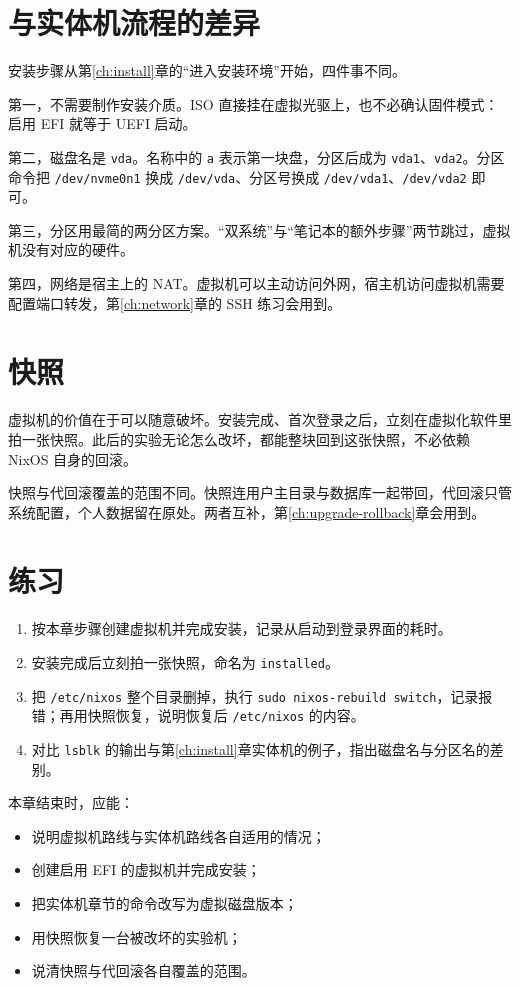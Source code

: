\section{与实体机流程的差异}

安装步骤从第\ref{ch:install}章的“进入安装环境”开始，四件事不同。

第一，不需要制作安装介质。ISO 直接挂在虚拟光驱上，也不必确认固件模式：启用 EFI 就等于 UEFI 启动。

第二，磁盘名是 \texttt{vda}。名称中的 \texttt{a} 表示第一块盘，分区后成为 \texttt{vda1}、\texttt{vda2}。分区命令把 \texttt{/dev/nvme0n1} 换成 \texttt{/dev/vda}、分区号换成 \texttt{/dev/vda1}、\texttt{/dev/vda2} 即可。

第三，分区用最简的两分区方案。“双系统”与“笔记本的额外步骤”两节跳过，虚拟机没有对应的硬件。

第四，网络是宿主上的 NAT。虚拟机可以主动访问外网，宿主机访问虚拟机需要配置端口转发，第\ref{ch:network}章的 SSH 练习会用到。


\section{快照}

虚拟机的价值在于可以随意破坏。安装完成、首次登录之后，立刻在虚拟化软件里拍一张快照。此后的实验无论怎么改坏，都能整块回到这张快照，不必依赖 NixOS 自身的回滚。

快照与代回滚覆盖的范围不同。快照连用户主目录与数据库一起带回，代回滚只管系统配置，个人数据留在原处。两者互补，第\ref{ch:upgrade-rollback}章会用到。

\section{练习}

\begin{enumerate}
  \item 按本章步骤创建虚拟机并完成安装，记录从启动到登录界面的耗时。
  \item 安装完成后立刻拍一张快照，命名为 \texttt{installed}。
  \item 把 \texttt{/etc/nixos} 整个目录删掉，执行 \texttt{sudo nixos-rebuild switch}，记录报错；再用快照恢复，说明恢复后 \texttt{/etc/nixos} 的内容。
  \item 对比 \texttt{lsblk} 的输出与第\ref{ch:install}章实体机的例子，指出磁盘名与分区名的差别。
\end{enumerate}

\begin{checkpoint}
本章结束时，应能：
\begin{itemize}
  \item 说明虚拟机路线与实体机路线各自适用的情况；
  \item 创建启用 EFI 的虚拟机并完成安装；
  \item 把实体机章节的命令改写为虚拟磁盘版本；
  \item 用快照恢复一台被改坏的实验机；
  \item 说清快照与代回滚各自覆盖的范围。
\end{itemize}
\end{checkpoint}

